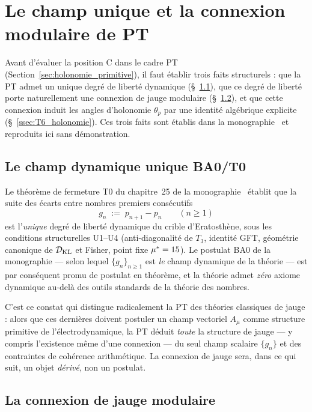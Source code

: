 \section{Le champ unique et la connexion modulaire de PT}
\label{sec:champ_connexion}

Avant d'évaluer la position C dans le cadre PT
(Section~\ref{sec:holonomie_primitive}), il faut établir trois
faits structurels : que la PT admet un unique degré de liberté
dynamique (\S~\ref{ssec:BA0}), que ce degré de liberté porte
naturellement une connexion de jauge modulaire
(\S~\ref{ssec:connexion_jauge}), et que cette connexion induit
les angles d'holonomie $\theta_p$ par une identité algébrique
explicite (\S~\ref{ssec:T6_holonomie}). Ces trois faits sont
établis dans la monographie~\cite{PT_Monograph} et reproduits ici
sans démonstration.

\subsection{Le champ dynamique unique BA0/T0}
\label{ssec:BA0}

Le théorème de fermeture T0 du chapitre~25 de la
monographie~\cite{PT_Monograph} établit que la suite des écarts
entre nombres premiers consécutifs
\begin{equation}
  g_n \;:=\; p_{n+1} - p_n
  \qquad (n \geq 1)
  \label{eq:g_n_def_fr}
\end{equation}
est l'\emph{unique} degré de liberté dynamique du crible
d'Eratosthène, sous les conditions structurelles U1--U4
(anti-diagonalité de $T_3$, identité GFT, géométrie canonique de
$\mathcal{D}_{\rm KL}$ et Fisher, point fixe ${\mu^{*}} = 15$). Le
postulat BA0 de la monographie --- selon lequel
$\{g_n\}_{n \geq 1}$ est \emph{le} champ dynamique de la théorie ---
est par conséquent promu de postulat en théorème, et la théorie
admet \emph{zéro} axiome dynamique au-delà des outils standards
de la théorie des nombres.

C'est ce constat qui distingue radicalement la PT des théories
classiques de jauge : alors que ces dernières doivent postuler un
champ vectoriel $A_\mu$ comme structure primitive de
l'électrodynamique, la PT déduit \emph{toute} la structure de
jauge --- y compris l'existence même d'une connexion --- du seul
champ scalaire $\{g_n\}$ et des contraintes de cohérence
arithmétique. La connexion de jauge sera, dans ce qui suit, un
objet \emph{dérivé}, non un postulat.

\subsection{La connexion de jauge modulaire}
\label{ssec:connexion_jauge}

